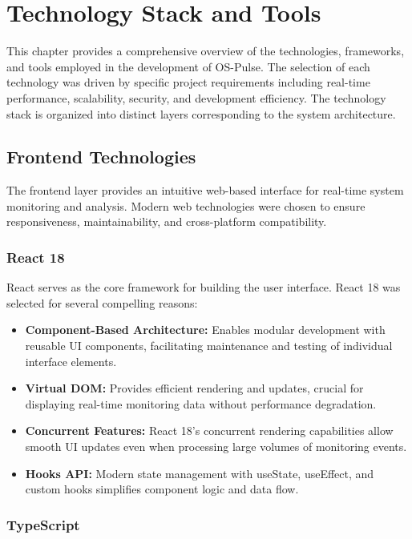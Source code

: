 \chapter{Technology Stack and Tools}

This chapter provides a comprehensive overview of the technologies, frameworks, and tools employed in the development of OS-Pulse. The selection of each technology was driven by specific project requirements including real-time performance, scalability, security, and development efficiency. The technology stack is organized into distinct layers corresponding to the system architecture.

\section{Frontend Technologies}

The frontend layer provides an intuitive web-based interface for real-time system monitoring and analysis. Modern web technologies were chosen to ensure responsiveness, maintainability, and cross-platform compatibility.

\subsection{React 18}

React serves as the core framework for building the user interface. React 18 was selected for several compelling reasons:

\begin{itemize}
    \item \textbf{Component-Based Architecture:} Enables modular development with reusable UI components, facilitating maintenance and testing of individual interface elements.
    \item \textbf{Virtual DOM:} Provides efficient rendering and updates, crucial for displaying real-time monitoring data without performance degradation.
    \item \textbf{Concurrent Features:} React 18's concurrent rendering capabilities allow smooth UI updates even when processing large volumes of monitoring events.
    \item \textbf{Hooks API:} Modern state management with useState, useEffect, and custom hooks simplifies component logic and data flow.
\end{itemize}

\subsection{TypeScript}

